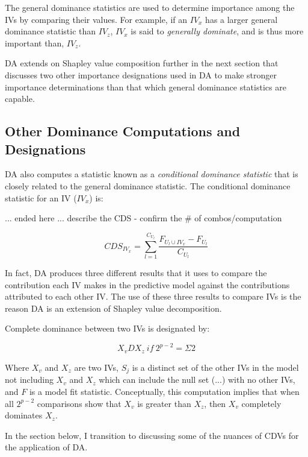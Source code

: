 \documentclass[ShortAfour,times,sageapa]{sagej}
\begin{document}
	The general dominance statistics are used to determine importance among the IVs by comparing their values.
	For example, if an $IV_x$ has a larger general dominance statistic than $IV_z$, $IV_x$ is said to \emph{generally dominate}, and is thus more important than, $IV_z$.
	
	DA extends on Shapley value composition further in the next section that discusses two other importance designations used in DA to make stronger importance determinations than that which general dominance statistics are capable.
	
	\subsection{Other Dominance Computations and Designations}
	
	DA also computes a statistic known as a \emph{conditional dominance statistic} that is closely related to the general dominance statistic.  
	The conditional dominance statistic for an IV ($IV_x$) is:
	
	... ended here ... describe the CDS - confirm the \# of combos/computation
	
	\begin{equation}
		CDS_{IV_x} = \sum_{l=1}^{C_{U_l}} \frac{ F_{U_l \cup IV_x} - F_{U_l}}{C_{U_l}}
	\end{equation}
	
	In fact, DA produces three different results that it uses to compare the contribution each IV makes in the predictive model against the contributions attributed to each other IV. 
	The use of these three results to compare IVs is the reason DA is an extension of Shapley value decomposition.
	
	Complete dominance between two IVs is designated by:
	
	\begin{equation}
		X_{v}DX_{z}\ if\ 2^{p-2} = \Sigma{2}
	\end{equation}
	
	Where $X_v$ and $X_z$ are two IVs, $S_j$ is a distinct set of the other IVs in the model not including $X_v$ and $X_z$ which can include the null set (...) with no other IVs, and $F$ is a model fit statistic. Conceptually, this computation implies that when all $2^{p-2}$ comparisons show that $X_v$ is greater than $X_z$, then $X_v$ completely dominates $X_z$.
	
	In the section below, I transition to discussing some of the nuances of CDVs for the application of DA.
	
\end{document}
